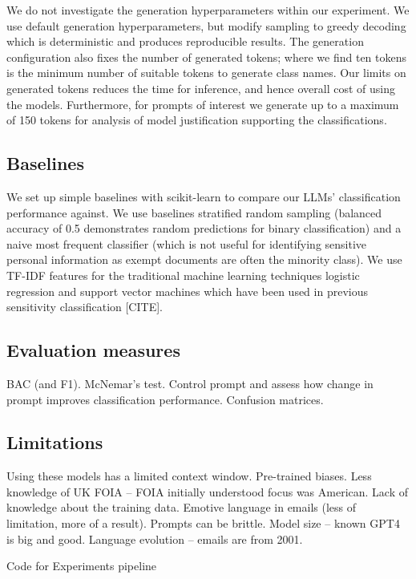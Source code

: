 We do not investigate the generation hyperparameters within our experiment. We use default generation hyperparameters, but modify sampling to greedy decoding which is deterministic and produces reproducible results. The generation configuration also fixes the number of generated tokens; where we find ten tokens is the minimum number of suitable tokens to generate class names. Our limits on generated tokens reduces the time for inference, and hence overall cost of using the models. Furthermore, for prompts of interest we generate up to a maximum of 150 tokens for analysis of model justification supporting the classifications.

\subsection{Baselines}
We set up simple baselines with scikit-learn to compare our LLMs’ classification performance against. We use baselines stratified random sampling (balanced accuracy of 0.5 demonstrates random predictions for binary classification) and a naive most frequent classifier (which is not useful for identifying sensitive personal information as exempt documents are often the minority class). We use TF-IDF features for the traditional machine learning techniques logistic regression and support vector machines which have been used in previous sensitivity classification [CITE].

\subsection{Evaluation measures}
BAC (and F1).
McNemar’s test. Control prompt and assess how change in prompt improves classification performance.
Confusion matrices.

\subsection{Limitations}
Using these models has a limited context window.
Pre-trained biases.
Less knowledge of UK FOIA – FOIA initially understood focus was American.
Lack of knowledge about the training data.
Emotive language in emails (less of limitation, more of a result).
Prompts can be brittle.
Model size – known GPT4 is big and good.
Language evolution – emails are from 2001.


Code for Experiments 
pipeline

